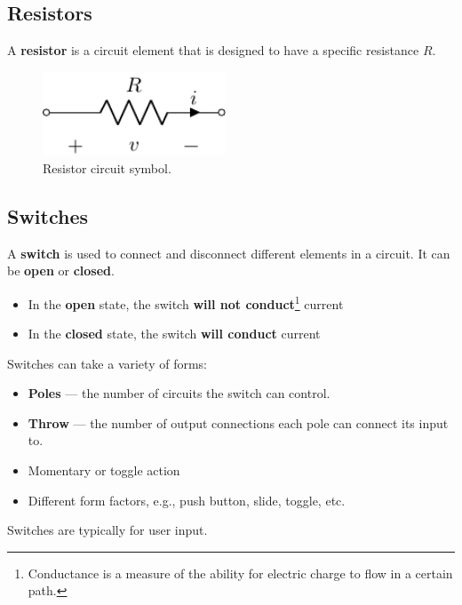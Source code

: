 \documentclass{report}
\begin{document}
\subsection{Resistors}
A \textbf{resistor} is a circuit element that is designed to have a specific resistance \(R\).
\begin{figure}[H]
    \centering
    \includegraphics[height = 2.5cm, keepaspectratio = true]{figures/resistor.pdf}
    \caption{Resistor circuit symbol.} %
\end{figure}
\subsection{Switches}
A \textbf{switch} is used to connect and disconnect different elements in a circuit. It can be \textbf{open}
or \textbf{closed}.
\begin{itemize}
    \item In the \textbf{open} state, the switch \textbf{will not conduct}\footnote{Conductance is a measure of the ability for electric charge to flow in a certain path.} current
    \item In the \textbf{closed} state, the switch \textbf{will conduct} current
\end{itemize}
Switches can take a variety of forms:
\begin{itemize}
    \item \textbf{Poles} --- the number of circuits the switch can control.
    \item \textbf{Throw} --- the number of output connections each pole can connect its input to.
    \item Momentary or toggle action
    \item Different form factors, e.g., push button, slide, toggle, etc.
\end{itemize}
Switches are typically for user input.
\end{document}
